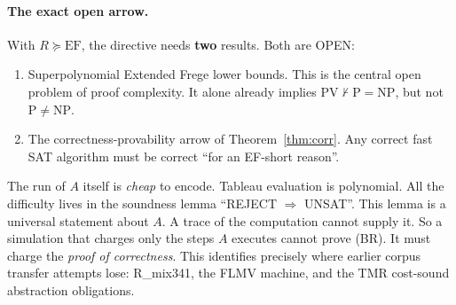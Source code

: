 \documentclass[11pt]{article}
\theoremstyle{definition}
\begin{document}
\paragraph{The exact open arrow.}
With $R\succeq\mathrm{EF}$, the directive needs \textbf{two} results. Both are OPEN:
\begin{enumerate}
\item[(LB$_{\mathrm{EF}}$)] Superpolynomial Extended Frege lower bounds. This is the
central open problem of proof complexity. It alone already implies
$\mathrm{PV}\nvdash\mathrm{P}=\mathrm{NP}$, but not $\mathrm{P}\ne\mathrm{NP}$.
\item[(CPA)] The correctness-provability arrow of Theorem~\ref{thm:corr}. Any correct
fast SAT algorithm must be correct ``for an EF-short reason''.
\end{enumerate}
The run of $A$ itself is \emph{cheap} to encode. Tableau evaluation is polynomial. All the
difficulty lives in the soundness lemma ``REJECT $\Rightarrow$ UNSAT''. This lemma is a
universal statement about $A$. A trace of the computation cannot supply it. So a
simulation that charges only the steps $A$ executes cannot prove (BR). It must charge the
\emph{proof of correctness}. This identifies precisely where earlier corpus transfer
attempts lose: R\_mix341, the FLMV machine, and the TMR cost-sound abstraction obligations.
\end{document}
